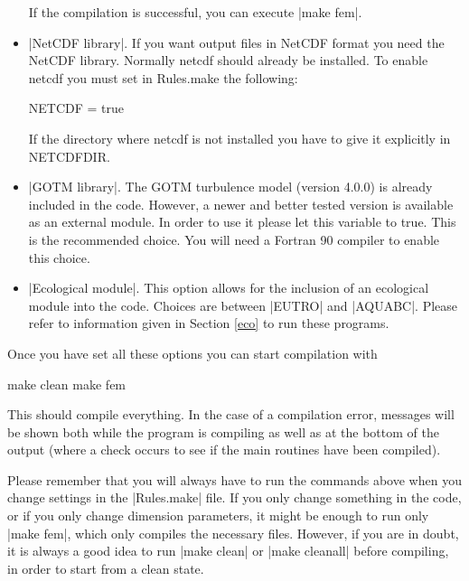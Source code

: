 \begin{itemize}
If the compilation is successful, you can execute |make fem|.

\item |NetCDF library|. If you want output files in NetCDF format
you need the NetCDF library. Normally netcdf should already be installed. To enable netcdf you
must set in Rules.make the following:

NETCDF = true

If the directory where netcdf is not installed you have to give it
explicitly in NETCDFDIR.


\item |GOTM library|. The GOTM turbulence model (version 4.0.0) is already included in
the code. However, a newer and better tested version is available as an
external module. In order to use it please let this variable to true. This
is the recommended choice. You will need a Fortran 90 compiler to enable
this choice.

\item |Ecological module|. This option allows for the inclusion of an
ecological module into the code. Choices are between |EUTRO|
and |AQUABC|. Please refer to information given in Section \ref{eco}
to run these programs.



\end{itemize}

Once you have set all these options you can start compilation with

\begin{code}
    make clean
    make fem
\end{code}

This should compile everything. In the case of a compilation error,
 messages will be shown both while the program is compiling as 
well as at the bottom of the output (where a check occurs to see if 
the main routines have been compiled).

Please remember that you will always have to run the commands above
when you change settings in the |Rules.make| file. If you only change
something in the code, or if you only change dimension parameters, it
might be enough to run only |make fem|, which only compiles the necessary
files. However, if you are in doubt, it is always a good idea to run
|make clean| or |make cleanall| before compiling, in order to start from
a clean state.


